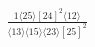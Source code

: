 \documentclass[varwidth, border=5pt]{standalone}
\begin{document}
\begin{my}
$\begin{gathered}
\scriptscriptstyle\frac{1⟨25⟩[24]^2⟨12⟩}{⟨13⟩⟨15⟩⟨23⟩[25]^2}
\end{gathered}$
\end{my}
\end{document}
